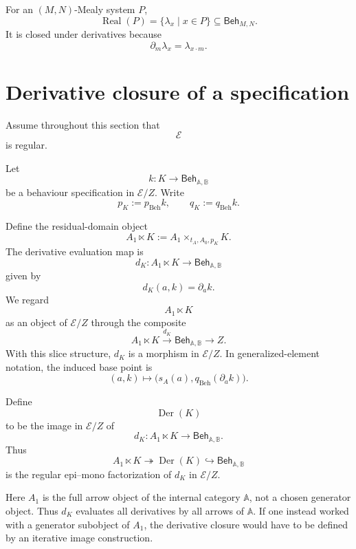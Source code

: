 \begin{example}
\label{ex:monoid-realized-behaviours}
For an \((M,N)\)-Mealy system \(P\),
\[
\operatorname{Real}(P)
=
\{\lambda_x\mid x\in P\}
\subseteq
\mathsf{Beh}_{M,N}.
\]
It is closed under derivatives because
\[
\partial_m\lambda_x=\lambda_{x\cdot m}.
\]
\end{example}

\section{Derivative closure of a specification}
\label{sec:derivative-closure-specification}

Assume throughout this section that
\[
\mathcal E
\]
is regular.

Let
\[
k:K\to\mathsf{Beh}_{\mathbb A,\mathbb B}
\]
be a behaviour specification in \(\mathcal E/Z\). Write
\[
p_K:=p_{\mathrm{Beh}}k,
\qquad
q_K:=q_{\mathrm{Beh}}k.
\]

Define the residual-domain object
\[
A_1\ltimes K
:=
A_1\times_{t_A,A_0,p_K}K.
\]
The derivative evaluation map is
\[
d_K:
A_1\ltimes K
\to
\mathsf{Beh}_{\mathbb A,\mathbb B}
\]
given by
\[
d_K(a,k)=\partial_a k.
\]
We regard
\[
A_1\ltimes K
\]
as an object of \(\mathcal E/Z\) through the composite
\[
A_1\ltimes K
\xrightarrow{d_K}
\mathsf{Beh}_{\mathbb A,\mathbb B}
\to
Z.
\]
With this slice structure, \(d_K\) is a morphism in \(\mathcal E/Z\). In
generalized-element notation, the induced base point is
\[
(a,k)\longmapsto
\bigl(s_A(a),q_{\mathrm{Beh}}(\partial_a k)\bigr).
\]

\begin{definition}
\label{def:derivative-closure}
Define
\[
\operatorname{Der}(K)
\]
to be the image in \(\mathcal E/Z\) of
\[
d_K:
A_1\ltimes K
\to
\mathsf{Beh}_{\mathbb A,\mathbb B}.
\]
Thus
\[
A_1\ltimes K
\twoheadrightarrow
\operatorname{Der}(K)
\hookrightarrow
\mathsf{Beh}_{\mathbb A,\mathbb B}
\]
is the regular epi--mono factorization of \(d_K\) in \(\mathcal E/Z\).
\end{definition}

\begin{remark}
\label{rem:derivative-closure-full-arrow-object}
Here \(A_1\) is the full arrow object of the internal category \(\mathbb A\),
not a chosen generator object. Thus \(d_K\) evaluates all derivatives by all
arrows of \(\mathbb A\). If one instead worked with a generator subobject of
\(A_1\), the derivative closure would have to be defined by an iterative image
construction.
\end{remark}


